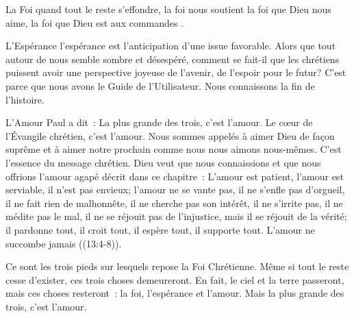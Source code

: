 La Foi \ocadr quand tout le reste s'effondre, la foi nous soutient \fcadr{}
 la foi que Dieu nous aime, la foi que Dieu est \Og aux commandes \Fg{}.

L'Espérance \ocadr l'espérance est l'anticipation d'une issue favorable.
 Alors que tout autour de nous semble sombre et désespéré,
 comment se fait-il que les chrétiens puissent avoir une perspective
 joyeuse de l'avenir, de l'espoir pour le futur?
 C'est parce que nous avons le Guide de l'Utilisateur.
 Nous connaissons la fin de l'histoire.


L'Amour \ocadr Paul a dit~: 
 \Og La plus grande des trois, c'est l'amour. \Fg{}
 Le c\oe{}ur de l'Évangile chrétien, c'est l'amour.
 Nous sommes appelés à aimer Dieu de fa\c{c}on suprême
 et à aimer notre prochain comme nous nous aimons nous-mêmes.
 C'est l'essence du message chrétien.
 Dieu veut que nous connaissions et que nous offrions
 l'amour \Og agapé \Fg{} décrit dans ce chapitre~:
 \Og L'amour est patient, l'amour est serviable,
 il n'est pas envieux; l'amour ne se vante pas,
 il ne s'enfle pas d'orgueil, il ne fait rien de malhonnête,
 il ne cherche pas son intérêt, il ne s'irrite pas,
 il ne médite pas le mal, il ne se réjouit pas de l'injustice,
 mais il se réjouit de la vérité;
 il pardonne tout, il croit tout, il espère tout,
 il supporte tout. L'amour ne succombe jamais \Fg{}
 ((13:4-8)). 

Ce sont les trois pieds sur lesquels repose la Foi Chrétienne. 
 Même si tout le reste cesse d'exister, ces trois choses demeureront.
 En fait, le ciel et la terre passeront, mais ces choses resteront~:
 la foi, l'espérance et l'amour.
 Mais la plus grande des trois, c'est l'amour.

\dvrule






